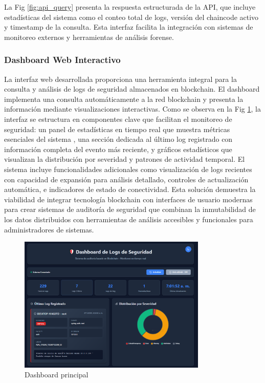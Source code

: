 La Fig \ref{fig:api_query} presenta la respuesta estructurada de la API, que incluye estadísticas del sistema como el conteo total de logs, versión del chaincode activo y timestamp de la consulta. Esta interfaz facilita la integración con sistemas de monitoreo externos y herramientas de análisis forense.


\subsubsection{Dashboard Web Interactivo}
La interfaz web desarrollada proporciona una herramienta integral para la consulta y análisis de logs de seguridad almacenados en blockchain. El dashboard implementa una consulta automáticamente a la red blockchain y presenta la información mediante visualizaciones interactivas.
Como se observa en la Fig \ref{fig:dashboard_principal}, la interfaz se estructura en componentes clave que facilitan el monitoreo de seguridad: un panel de estadísticas en tiempo real que muestra métricas esenciales del sistema , una sección dedicada al último log registrado con información completa del evento más reciente, y gráficos estadísticos que visualizan la distribución por severidad y patrones de actividad temporal.
El sistema incluye funcionalidades adicionales como visualización de logs recientes con capacidad de expansión para análisis detallado, controles de actualización automática, e indicadores de estado de conectividad. 
Esta solución demuestra la viabilidad de integrar tecnología blockchain con interfaces de usuario modernas para crear sistemas de auditoría de seguridad que combinan la inmutabilidad de los datos distribuidos con herramientas de análisis accesibles y funcionales para administradores de sistemas.
\begin{figure}[H]
    \centering
    \includegraphics[width=0.8\textwidth]{figuras/dashboard_web.png}
    \caption{Dashboard principal}
    \label{fig:dashboard_principal}
\end{figure}

